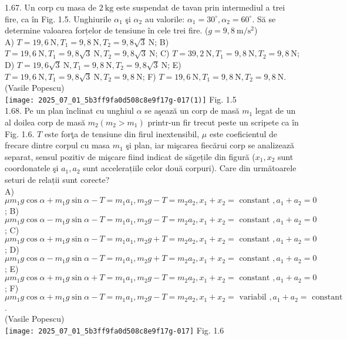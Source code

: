 1.67. Un corp cu masa de $2 \mathrm{~kg}$ este suspendat de tavan prin intermediul a trei fire, ca în Fig. 1.5. Unghiurile $\alpha_{1}$ şi $\alpha_{2}$ au valorile: $\alpha_{1}=30^{\circ}, \alpha_{2}=60^{\circ}$. Să se determine valoarea forțelor de tensiune în cele trei fire. ($g=9,8 \mathrm{~m} / \mathrm{s}^{2}$)\\ A) $T=19,6 \mathrm{~N}, T_{1}=9,8 \mathrm{~N}, T_{2}=9,8 \sqrt{3} \mathrm{~N}$; B) $T=19,6 \mathrm{~N}, T_{1}=9,8 \sqrt{3} \mathrm{~N}, T_{2}=9,8 \sqrt{3} \mathrm{~N}$; C) $T=39,2 \mathrm{~N}, T_{1}=9,8 \mathrm{~N}, T_{2}=9,8 \mathrm{~N}$; D) $T=19,6 \sqrt{3} \mathrm{~N}, T_{1}=9,8 \mathrm{~N}, T_{2}=9,8 \sqrt{3} \mathrm{~N}$; E) $T=19,6 \mathrm{~N}, T_{1}=9,8 \sqrt{3} \mathrm{~N}, T_{2}=9,8 \mathrm{~N}$; F) $T=19,6 \mathrm{~N}, T_{1}=9,8 \mathrm{~N}, T_{2}=9,8 \mathrm{~N}$.\\ (Vasile Popescu)\\ \texttt{[image: 2025\_07\_01\_5b3ff9fa0d508c8e9f17g-017(1)]} Fig. 1.5\\

1.68. Pe un plan înclinat cu unghiul $\alpha$ se aşează un corp de masă $m_{1}$ legat de un al doilea corp de masă $m_{2} \left(m_{2}>m_{1}\right)$ printr-un fir trecut peste un scripete ca în Fig. 1.6. $T$ este forţa de tensiune din firul inextensibil, $\mu$ este coeficientul de frecare dintre corpul cu masa $m_{1}$ şi plan, iar mişcarea fiecărui corp se analizează separat, sensul pozitiv de mişcare fiind indicat de săgețile din figură ($x_{1}, x_{2}$ sunt coordonatele şi $a_{1}, a_{2}$ sunt accelerațiile celor două corpuri). Care din următoarele seturi de relații sunt corecte?\\ A) $\mu m_{1} g \cos \alpha+m_{1} g \sin \alpha-T=m_{1} a_{1}, m_{2} g-T=m_{2} a_{2}, x_{1}+x_{2}=\text{ constant }, a_{1}+a_{2}=0$; B) $\mu m_{1} g \cos \alpha-m_{1} g \sin \alpha-T=m_{1} a_{1}, m_{2} g-T=m_{2} a_{2}, x_{1}+x_{2}=\text{ constant }, a_{1}+a_{2}=0$; C) $\mu m_{1} g \cos \alpha+m_{1} g \sin \alpha-T=m_{1} a_{1}, m_{2} g+T=m_{2} a_{2}, x_{1}+x_{2}=\text{ constant }, a_{1}+a_{2}=0$; D) $\mu m_{1} g \cos \alpha-m_{1} g \sin \alpha-T=m_{1} a_{1}, m_{2} g+T=m_{2} a_{2}, x_{1}+x_{2}=\text{ constant }, a_{1}+a_{2}=0$; E) $\mu m_{1} g \cos \alpha+m_{1} g \sin \alpha+T=m_{1} a_{1}, m_{2} g-T=m_{2} a_{2}, x_{1}+x_{2}=\text{ constant }, a_{1}+a_{2}=0$; F) $\mu m_{1} g \cos \alpha+m_{1} g \sin \alpha-T=m_{1} a_{1}, m_{2} g-T=m_{2} a_{2}, x_{1}+x_{2}=\text{ variabil }, a_{1}+a_{2}=\text{ constant }$.\\ (Vasile Popescu)\\ \texttt{[image: 2025\_07\_01\_5b3ff9fa0d508c8e9f17g-017]} Fig. 1.6\\

